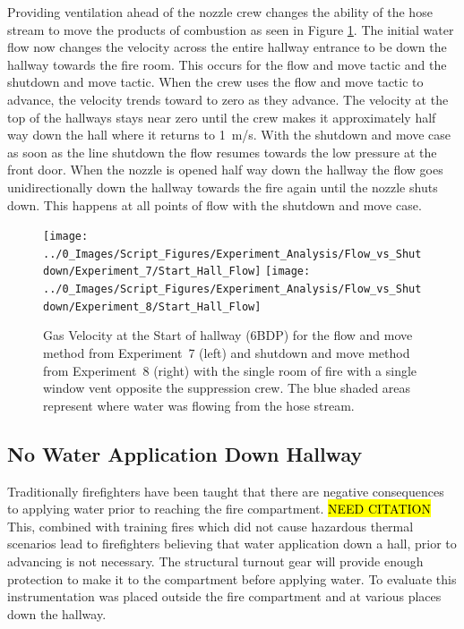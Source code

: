 \documentclass[12pt,oneside]{book}
\begin{document}
Providing ventilation ahead of the nozzle crew changes the ability of the hose stream to move the products of combustion as seen in Figure \ref{fig:Flow_vs_Shut_Single_Vent_Velocity}. The initial water flow now changes the velocity across the entire hallway entrance to be down the hallway towards the fire room. This occurs for the flow and move tactic and the shutdown and move tactic. When the crew uses the flow and move tactic to advance, the velocity trends toward to zero as they advance. The velocity at the top of the hallways stays near zero until the crew makes it approximately half way down the hall where it returns to 1~m/s. With the shutdown and move case as soon as the line shutdown the flow resumes towards the low pressure at the front door. When the nozzle is opened half way down the hallway the flow goes unidirectionally down the hallway towards the fire again until the nozzle shuts down. This happens at all points of flow with the shutdown and move case.

\begin{figure}[H]
\centering
\texttt{[image: ../0\_Images/Script\_Figures/Experiment\_Analysis/Flow\_vs\_Shutdown/Experiment\_7/Start\_Hall\_Flow]}
\texttt{[image: ../0\_Images/Script\_Figures/Experiment\_Analysis/Flow\_vs\_Shutdown/Experiment\_8/Start\_Hall\_Flow]}
\caption[Airflow - Single Vent - Flow \& Move vs. Shutdown \& Move]{Gas Velocity at the Start of hallway (6BDP) for the flow and move method from Experiment~7 (left) and shutdown and move method from Experiment~8 (right) with the single room of fire with a single window vent opposite the suppression crew. The blue shaded areas represent where water was flowing from the hose stream.}
\label{fig:Flow_vs_Shut_Single_Vent_Velocity}
\end{figure}

\subsection{No Water Application Down Hallway}
Traditionally firefighters have been taught that there are negative consequences to applying water prior to reaching the fire compartment. \hl{NEED CITATION} This, combined with training fires which did not cause hazardous thermal scenarios lead to firefighters believing that water application down a hall, prior to advancing is not necessary. The structural turnout gear will provide enough protection to make it to the compartment before applying water. To evaluate this instrumentation was placed outside the fire compartment and at various places down the hallway.
\end{document}
